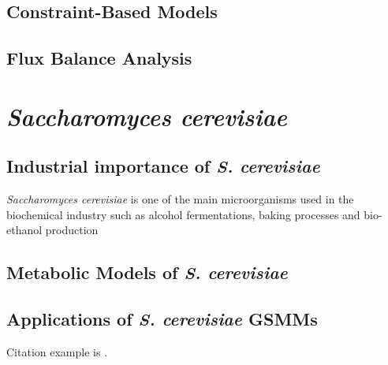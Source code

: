 \subsection{Constraint-Based Models}
\subsection{Flux Balance Analysis}

\section{\emph{Saccharomyces cerevisiae}}
\subsection{Industrial importance of \emph{S. cerevisiae}}

\emph{Saccharomyces cerevisiae} is one of the main microorganisms used in the biochemical industry such as alcohol fermentations, baking processes and bio-ethanol production


\subsection{Metabolic Models of \emph{S. cerevisiae}}
\subsection{Applications of \emph{S. cerevisiae} GSMMs}

Citation example is \cite{aran2006signlanguagetutoring}.
